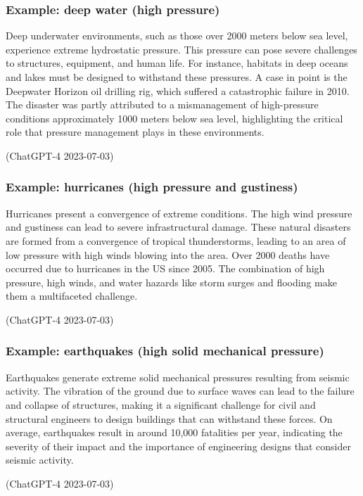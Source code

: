 \subsubsection{Example: deep water (high pressure)}
\begin{quoting}
    Deep underwater environments, such as those over 2000 meters below sea level, experience extreme hydrostatic pressure. This pressure can pose severe challenges to structures, equipment, and human life. For instance, habitats in deep oceans and lakes must be designed to withstand these pressures. A case in point is the Deepwater Horizon oil drilling rig, which suffered a catastrophic failure in 2010. The disaster was partly attributed to a mismanagement of high-pressure conditions approximately 1000 meters below sea level, highlighting the critical role that pressure management plays in these environments.

    (ChatGPT-4 2023-07-03)
\end{quoting}
\subsubsection{Example: hurricanes (high pressure and gustiness)}
\begin{quoting}
    Hurricanes present a convergence of extreme conditions. The high wind pressure and gustiness can lead to severe infrastructural damage. These natural disasters are formed from a convergence of tropical thunderstorms, leading to an area of low pressure with high winds blowing into the area. Over 2000 deaths have occurred due to hurricanes in the US since 2005. The combination of high pressure, high winds, and water hazards like storm surges and flooding make them a multifaceted challenge.

    (ChatGPT-4 2023-07-03)
\end{quoting}
\subsubsection{Example: earthquakes (high solid mechanical pressure)}
\begin{quoting}
    Earthquakes generate extreme solid mechanical pressures resulting from seismic activity. The vibration of the ground due to surface waves can lead to the failure and collapse of structures, making it a significant challenge for civil and structural engineers to design buildings that can withstand these forces. On average, earthquakes result in around 10,000 fatalities per year, indicating the severity of their impact and the importance of engineering designs that consider seismic activity.

    (ChatGPT-4 2023-07-03)
\end{quoting}
